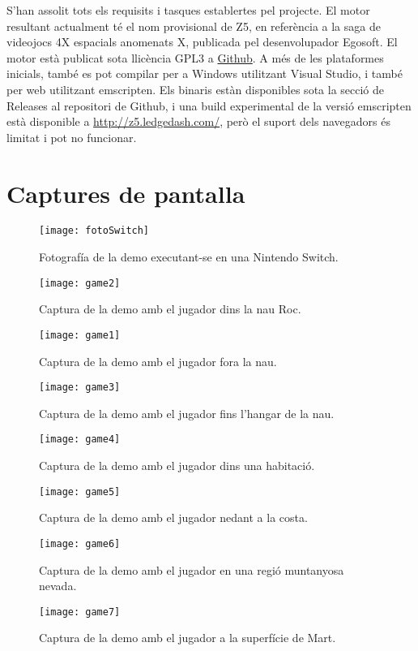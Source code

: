 S'han assolit tots els requisits i tasques establertes pel projecte. El motor resultant actualment té el nom provisional de Z5, en referència a la saga de videojocs 4X espacials anomenats X, publicada pel desenvolupador Egosoft.
El motor està publicat sota llicència GPL3 a \href{https://github.com/theKlanc/Z5}{Github}. A més de les plataformes inicials, també es pot compilar per a Windows utilitzant Visual Studio, i també per web utilitzant emscripten.
Els binaris estàn disponibles sota la secció de Releases al repositori de Github, i una build experimental de la versió emscripten està disponible a \url{http://z5.ledgedash.com/}, però el suport dels navegadors és limitat i pot no funcionar.

\section{Captures de pantalla}
\begin{figure}[]
  \centering
  \texttt{[image: fotoSwitch]}
  \caption{Fotografía de la demo executant-se en una Nintendo Switch.}
\end{figure}
\begin{figure}[]
  \centering
  \texttt{[image: game2]}
  \caption{Captura de la demo amb el jugador dins la nau Roc.}
\end{figure}
\begin{figure}[]
  \centering
  \texttt{[image: game1]}
  \caption{Captura de la demo amb el jugador fora la nau.}
\end{figure}
\begin{figure}[]
  \centering
  \texttt{[image: game3]}
  \caption{Captura de la demo amb el jugador fins l'hangar de la nau.}
\end{figure}
\begin{figure}[]
  \centering
  \texttt{[image: game4]}
  \caption{Captura de la demo amb el jugador dins una habitació.}
\end{figure}
\begin{figure}[]
  \centering
  \texttt{[image: game5]}
  \caption{Captura de la demo amb el jugador nedant a la costa.}
\end{figure}
\begin{figure}[]
  \centering
  \texttt{[image: game6]}
  \caption{Captura de la demo amb el jugador en una regió muntanyosa nevada.}
\end{figure}
\begin{figure}[]
  \centering
  \texttt{[image: game7]}
  \caption{Captura de la demo amb el jugador a la superfície de Mart.}
\end{figure}
